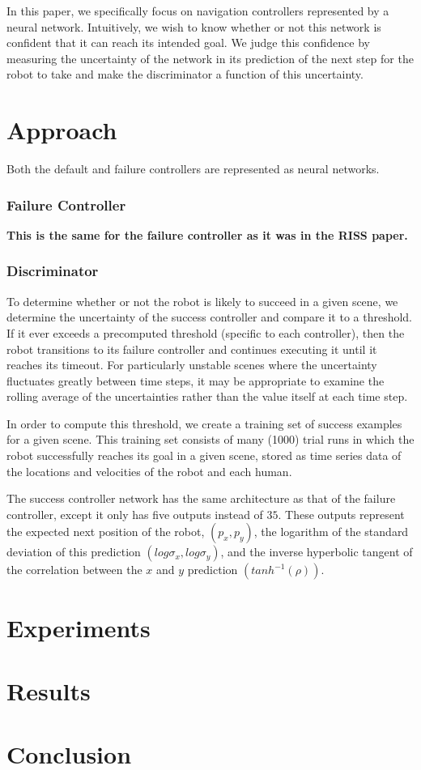 \documentclass[letterpaper]{IEEEtran}
\begin{document}
				In this paper, we specifically focus on navigation controllers represented by a neural network. Intuitively, we wish to know whether or not this network is confident that it can reach its intended goal. We judge this confidence by measuring the uncertainty of the network in its prediction of the next step for the robot to take and make the discriminator a function of this uncertainty. 
	\section{Approach}
			Both the default and failure controllers are represented as neural networks. 
			
			\subsubsection{Failure Controller}
				\textbf{This is the same for the failure controller as it was in the RISS paper.}
			
			\subsubsection{Discriminator}
				To determine whether or not the robot is likely to succeed in a given scene, we determine the uncertainty of the success controller and compare it to a threshold. If it ever exceeds a precomputed threshold (specific to each controller), then the robot transitions to its failure controller and continues executing it until it reaches its timeout. For particularly unstable scenes where the uncertainty fluctuates greatly between time steps, it may be appropriate to examine the rolling average of the uncertainties rather than the value itself at each time step. 
				
				In order to compute this threshold, we create a training set of success examples for a given scene. This training set consists of many (1000) trial runs in which the robot successfully reaches its goal in a given scene, stored as time series data of the locations and velocities of the robot and each human. 
				
				The success controller network has the same architecture as that of the failure controller, except it only has five outputs instead of $35$. These outputs represent the expected next position of the robot, $(p_x, p_y)$, the logarithm of the standard deviation of this prediction $(log\sigma_x, log\sigma_y)$, and the inverse hyperbolic tangent of the correlation between the $x$ and $y$ prediction $(tanh^{-1}(\rho))$. 
			
	\section{Experiments}
	\section{Results}
	\section{Conclusion}
	
\end{document}
